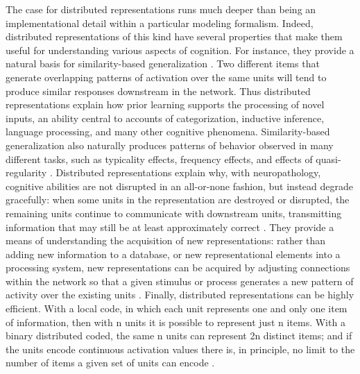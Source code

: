The case for distributed representations runs much deeper than being an implementational detail within a particular modeling formalism. Indeed, distributed representations of this kind have several properties that make them useful for understanding various aspects of cognition. For instance, they provide a natural basis for similarity-based generalization \cite{hinton_distributed_1984,RumelhartTodd93}. Two different items that generate overlapping patterns of activation over the same units will tend to produce similar responses downstream in the network. Thus distributed representations explain how prior learning supports the processing of novel inputs, an ability central to accounts of categorization, inductive inference, language processing, and many other cognitive phenomena. Similarity-based generalization also naturally produces patterns of behavior observed in many different tasks, such as typicality effects, frequency effects, and effects of quasi-regularity \cite{plaut_understanding_1996,rogers_semantic_2004}. Distributed representations explain why, with neuropathology, cognitive abilities are not disrupted in an all-or-none fashion, but instead degrade gracefully: when some units in the representation are destroyed or disrupted, the remaining units continue to communicate with downstream units, transmitting information that may still be at least approximately correct \cite{Allport85,cooper_shallice_2011}. They provide a means of understanding the acquisition of new representations: rather than adding new information to a database, or new representational elements into a processing system, new representations can be acquired by adjusting connections within the network so that a given stimulus or process generates a new pattern of activity over the existing units \cite{RumelhartTodd93}. Finally, distributed representations can be highly efficient. With a local code, in which each unit represents one and only one item of information, then with n units it is possible to represent just n items. With a binary distributed coded, the same n units can represent 2n distinct items; and if the units encode continuous activation values there is, in principle, no limit to the number of items a given set of units can encode \cite{hinton_distributed_1984}.

